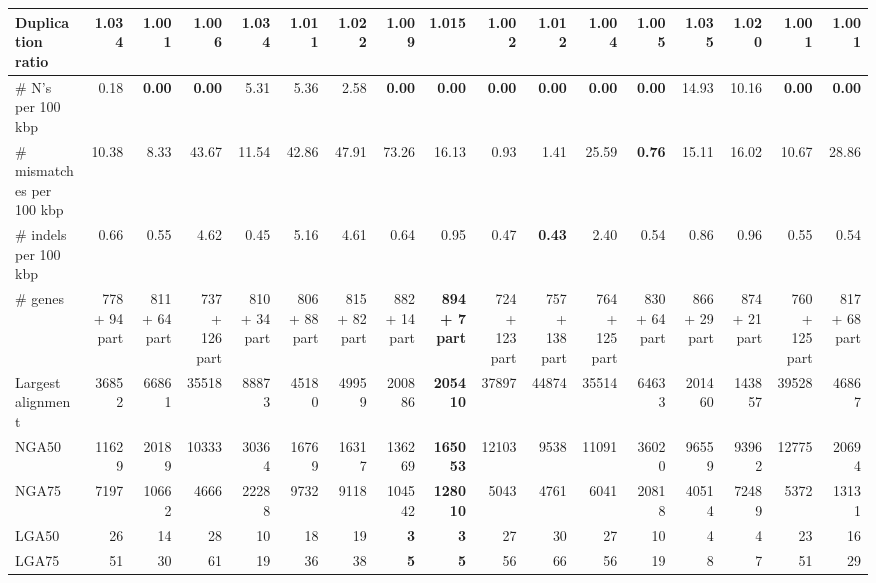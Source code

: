 \documentclass[12pt,a4paper]{article}
\begin{document}
\begin{table}[ht]
\begin{center}
\begin{tabular}{|l*{16}{|r}|}
Duplication ratio & 1.034 & {\bf 1.001} & 1.006 & 1.034 & 1.011 & 1.022 & 1.009 & 1.015 & 1.002 & 1.012 & 1.004 & 1.005 & 1.035 & 1.020 & {\bf 1.001} & {\bf 1.001} \\ \hline
\# N's per 100 kbp & 0.18 & {\bf 0.00} & {\bf 0.00} & 5.31 & 5.36 & 2.58 & {\bf 0.00} & {\bf 0.00} & {\bf 0.00} & {\bf 0.00} & {\bf 0.00} & {\bf 0.00} & 14.93 & 10.16 & {\bf 0.00} & {\bf 0.00} \\ \hline
\# mismatches per 100 kbp & 10.38 & 8.33 & 43.67 & 11.54 & 42.86 & 47.91 & 73.26 & 16.13 & 0.93 & 1.41 & 25.59 & {\bf 0.76} & 15.11 & 16.02 & 10.67 & 28.86 \\ \hline
\# indels per 100 kbp & 0.66 & 0.55 & 4.62 & 0.45 & 5.16 & 4.61 & 0.64 & 0.95 & 0.47 & {\bf 0.43} & 2.40 & 0.54 & 0.86 & 0.96 & 0.55 & 0.54 \\ \hline
\# genes & 778 + 94 part & 811 + 64 part & 737 + 126 part & 810 + 34 part & 806 + 88 part & 815 + 82 part & 882 + 14 part & {\bf 894 + 7 part} & 724 + 123 part & 757 + 138 part & 764 + 125 part & 830 + 64 part & 866 + 29 part & 874 + 21 part & 760 + 125 part & 817 + 68 part \\ \hline
Largest alignment & 36852 & 66861 & 35518 & 88873 & 45180 & 49959 & 200886 & {\bf 205410} & 37897 & 44874 & 35514 & 64633 & 201460 & 143857 & 39528 & 46867 \\ \hline
NGA50 & 11629 & 20189 & 10333 & 30364 & 16769 & 16317 & 136269 & {\bf 165053} & 12103 & 9538 & 11091 & 36020 & 96559 & 93962 & 12775 & 20694 \\ \hline
NGA75 & 7197 & 10662 & 4666 & 22288 & 9732 & 9118 & 104542 & {\bf 128010} & 5043 & 4761 & 6041 & 20818 & 40514 & 72489 & 5372 & 13131 \\ \hline
LGA50 & 26 & 14 & 28 & 10 & 18 & 19 & {\bf 3} & {\bf 3} & 27 & 30 & 27 & 10 & 4 & 4 & 23 & 16 \\ \hline
LGA75 & 51 & 30 & 61 & 19 & 36 & 38 & {\bf 5} & {\bf 5} & 56 & 66 & 56 & 19 & 8 & 7 & 51 & 29 \\ \hline
\end{tabular}
\end{center}
\end{table}
\end{document}
